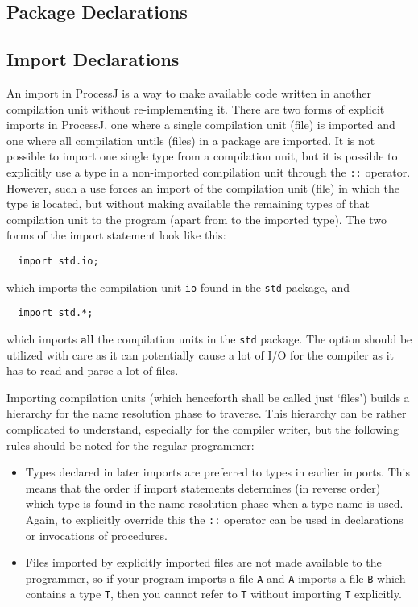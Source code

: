 \documentclass[pdflatex,11pt,letter]{article}
\begin{document}

\subsection{Package Declarations}


\subsection{Import Declarations}

An import in ProcessJ is a way to make available code written in another compilation unit without re-implementing it. There are two forms of explicit imports in ProcessJ, one where a single compilation unit (file) is imported and one where all compilation untils (files) in a package are imported. It is not possible to import one single type from a compilation unit, but it is possible to explicitly use a type in a non-imported compilation unit through the {\tt ::} operator. However, such a use forces an import of the compilation unit (file) in which the type is located, but without making available the remaining types of that compilation unit to the program (apart from to the imported type).
The two forms of the import statement look like this:
\begin{verbatim}
  import std.io;
\end{verbatim}
which imports the compilation unit {\tt io} found in the {\tt std} package, and 
\begin{verbatim}
  import std.*;
\end{verbatim}
which imports {\bf all} the compilation units in the {\tt std} package. The {\tt *} option should be utilized with care as it can potentially cause a lot of I/O for the compiler as it has to read and parse a lot of files.

Importing compilation units (which henceforth shall be called just `files') builds a hierarchy for the name resolution phase to traverse. This hierarchy can be rather complicated to understand, especially for the compiler writer, but the following rules should be noted for the regular programmer:
\begin{itemize}
\item Types declared in later imports are preferred to types in earlier imports. This means that the order if import statements determines (in reverse order) which type is found in the name resolution phase when a type name is used. Again, to explicitly override this the {\tt ::} operator can be used in declarations or invocations of procedures.
\item Files imported by explicitly imported files are not made available to the programmer, so if your program imports a file {\tt A} and {\tt A} imports a file {\tt B} which contains a type {\tt T}, then you cannot refer to {\tt T} without importing {\tt T} explicitly.
\end{itemize}
\end{document}

